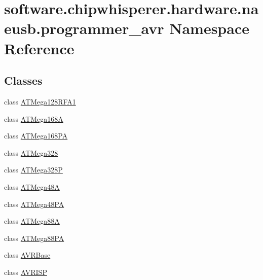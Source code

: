 \hypertarget{namespacesoftware_1_1chipwhisperer_1_1hardware_1_1naeusb_1_1programmer__avr}{}\section{software.\+chipwhisperer.\+hardware.\+naeusb.\+programmer\+\_\+avr Namespace Reference}
\label{namespacesoftware_1_1chipwhisperer_1_1hardware_1_1naeusb_1_1programmer__avr}
\subsection*{Classes}
\begin{DoxyCompactItemize}
\item 
class \hyperlink{classsoftware_1_1chipwhisperer_1_1hardware_1_1naeusb_1_1programmer__avr_1_1ATMega128RFA1}{A\+T\+Mega128\+R\+F\+A1}
\item 
class \hyperlink{classsoftware_1_1chipwhisperer_1_1hardware_1_1naeusb_1_1programmer__avr_1_1ATMega168A}{A\+T\+Mega168\+A}
\item 
class \hyperlink{classsoftware_1_1chipwhisperer_1_1hardware_1_1naeusb_1_1programmer__avr_1_1ATMega168PA}{A\+T\+Mega168\+P\+A}
\item 
class \hyperlink{classsoftware_1_1chipwhisperer_1_1hardware_1_1naeusb_1_1programmer__avr_1_1ATMega328}{A\+T\+Mega328}
\item 
class \hyperlink{classsoftware_1_1chipwhisperer_1_1hardware_1_1naeusb_1_1programmer__avr_1_1ATMega328P}{A\+T\+Mega328\+P}
\item 
class \hyperlink{classsoftware_1_1chipwhisperer_1_1hardware_1_1naeusb_1_1programmer__avr_1_1ATMega48A}{A\+T\+Mega48\+A}
\item 
class \hyperlink{classsoftware_1_1chipwhisperer_1_1hardware_1_1naeusb_1_1programmer__avr_1_1ATMega48PA}{A\+T\+Mega48\+P\+A}
\item 
class \hyperlink{classsoftware_1_1chipwhisperer_1_1hardware_1_1naeusb_1_1programmer__avr_1_1ATMega88A}{A\+T\+Mega88\+A}
\item 
class \hyperlink{classsoftware_1_1chipwhisperer_1_1hardware_1_1naeusb_1_1programmer__avr_1_1ATMega88PA}{A\+T\+Mega88\+P\+A}
\item 
class \hyperlink{classsoftware_1_1chipwhisperer_1_1hardware_1_1naeusb_1_1programmer__avr_1_1AVRBase}{A\+V\+R\+Base}
\item 
class \hyperlink{classsoftware_1_1chipwhisperer_1_1hardware_1_1naeusb_1_1programmer__avr_1_1AVRISP}{A\+V\+R\+I\+S\+P}
\end{DoxyCompactItemize}
